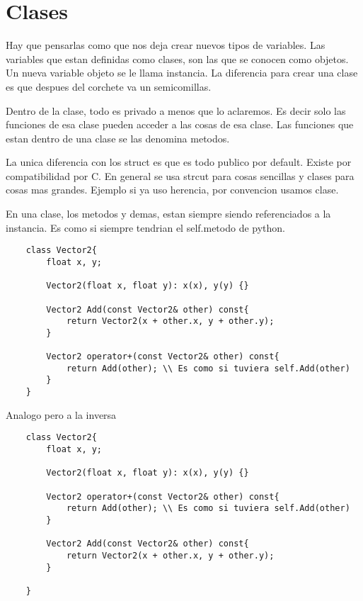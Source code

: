 \documentclass[11pt]{article}
\begin{document}
\section{Clases}
Hay que pensarlas como que nos deja crear nuevos tipos de variables.
Las variables que estan definidas como clases, son las que se conocen como objetos.
Un nueva variable objeto se le llama instancia.
La diferencia para crear una clase es que despues del corchete va un semicomillas.

Dentro de la clase, todo es privado a menos que lo aclaremos.
Es decir solo las funciones de esa clase pueden acceder a las cosas de esa clase.
Las funciones que estan dentro de una clase se las denomina metodos.

La unica diferencia con los struct es que es todo publico por default.
Existe por compatibilidad por C.
En general se usa strcut para cosas sencillas y clases para cosas mas grandes.
Ejemplo si ya uso herencia, por convencion usamos clase.

En una clase, los metodos y demas, estan siempre siendo referenciados a la instancia.
Es como si siempre tendrian el self.metodo de python.
\begin{lstlisting}
    class Vector2{
        float x, y;

        Vector2(float x, float y): x(x), y(y) {}

        Vector2 Add(const Vector2& other) const{
            return Vector2(x + other.x, y + other.y);
        }

        Vector2 operator+(const Vector2& other) const{
            return Add(other); \\ Es como si tuviera self.Add(other)
        }
    }
\end{lstlisting}
Analogo pero a la inversa
\begin{lstlisting}
    class Vector2{
        float x, y;

        Vector2(float x, float y): x(x), y(y) {}

        Vector2 operator+(const Vector2& other) const{
            return Add(other); \\ Es como si tuviera self.Add(other)
        }

        Vector2 Add(const Vector2& other) const{
            return Vector2(x + other.x, y + other.y);
        }

    }
\end{lstlisting}
\end{document}
